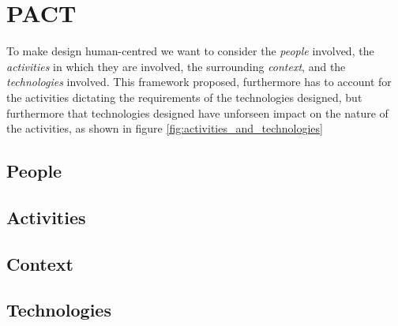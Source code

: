\section{PACT} \label{sec:pact} 
To make design human-centred we want to consider the \emph{people} involved, the \emph{activities} in which they are involved, the surrounding \emph{context}, and the \emph{technologies} involved. This framework proposed, furthermore has to account for the activities dictating the requirements of the technologies designed, but furthermore that technologies designed have unforseen impact on the nature of the activities, as shown in figure \ref{fig:activities_and_technologies} \cite[p. 25-26]{benyon_14}



\subsection{People}


\subsection{Activities}

\subsection{Context}

\subsection{Technologies}